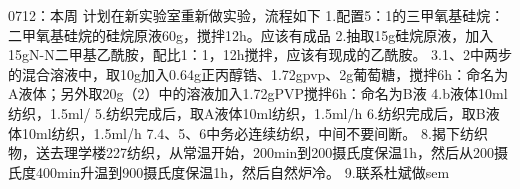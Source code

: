 0712：本周
计划在新实验室重新做实验，流程如下
1.配置5：1的三甲氧基硅烷：二甲氧基硅烷的硅烷原液60g，搅拌12h。应该有成品
2.抽取15g硅烷原液，加入15gN-N二甲基乙酰胺，配比1：1，12h搅拌，应该有现成的乙酰胺。
3.1、2中两步的混合溶液中，取10g加入0.64g正丙醇锆、1.72gpvp、2g葡萄糖，搅拌6h：命名为A液体；另外取20g（2）中的溶液加入1.72gPVP搅拌6h：命名为B液
4.b液体10ml纺织，1.5ml/
5.纺织完成后，取A液体10ml纺织，1.5ml/h
6.纺织完成后，取B液体10ml纺织，1.5ml/h
7.4、5、6中务必连续纺织，中间不要间断。
8.揭下纺织物，送去理学楼227纺织，从常温开始，200min到200摄氏度保温1h，然后从200摄氏度400min升温到900摄氏度保温1h，然后自然炉冷。
9.联系杜斌做sem
